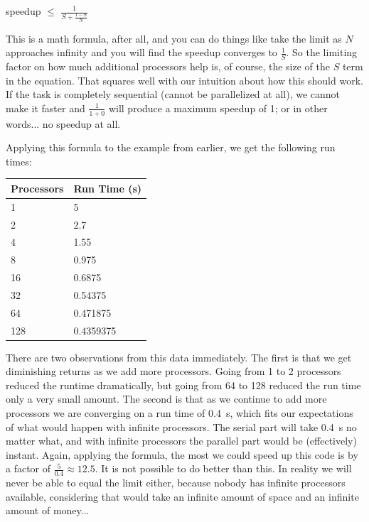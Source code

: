 \begin{center}
speedup $\leq$ {\huge $\frac{1}{S + \frac{1-S}{N}}$}
\end{center}

This is a math formula, after all, and you can do things like take the limit as $N$ approaches infinity and you will find the speedup converges to $\frac{1}{S}$. So the limiting factor on how much additional processors help is, of course, the size of the $S$ term in the equation. That squares well with our intuition about how this should work. If the task is completely sequential (cannot be parallelized at all), we cannot make it faster and $\frac{1}{1 + 0}$ will produce a maximum speedup of 1; or in other words... no speedup at all.

Applying this formula to the example from earlier, we get the following run times:

\begin{center}
	\begin{tabular}{l|l}
	\textbf{Processors} & \textbf{Run Time (s)} \\ \hline
	1 & 5\\
	2 & 2.7\\
	4 & 1.55\\
	8 & 0.975\\
	16 & 0.6875 \\
	32 & 0.54375 \\
	64 & 0.471875 \\
	128 & 0.4359375\\
	\end{tabular}
\end{center}

There are two observations from this data immediately. The first is that we get diminishing returns as we add more processors. Going from 1 to 2 processors reduced the runtime dramatically, but going from 64 to 128 reduced the run time only a very small amount. The second is that as we continue to add more processors we are converging on a run time of 0.4~s, which fits our expectations of what would happen with infinite processors. The serial part will take 0.4~s no matter what, and with infinite processors the parallel part would be (effectively) instant. Again, applying the formula, the most we could speed up this code is by a factor of $\frac{5}{0.4}\approx 12.5$. It is not possible to do better than this. In reality we will never be able to equal the limit either, because nobody has infinite processors available, considering that would take an infinite amount of space and an infinite amount of money...

